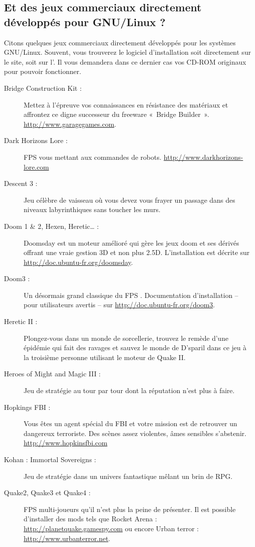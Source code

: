 \subsection{Et des jeux commerciaux directement développés pour GNU/Linux ?}
Citons quelques jeux commerciaux directement développés pour les systèmes GNU/Linux. Souvent, vous trouverez le logiciel d'installation soit directement sur le site, soit sur l'. Il vous demandera dans ce dernier cas vos CD-ROM originaux pour pouvoir fonctionner.\par
\begin{description}
\item[Bridge Construction Kit :] Mettez à l'épreuve vos connaissances en résistance des matériaux et affrontez ce digne successeur du freeware «~Bridge Builder~». \url{http://www.garagegames.com}.
\item[Dark Horizons Lore :] FPS vous mettant aux commandes de robots. \url{http://www.darkhorizons-lore.com}
\item[Descent 3 :] Jeu célèbre de vaisseau où vous devez vous frayer un passage dans des niveaux labyrinthiques sans toucher les murs.
\item[Doom 1 \& 2, Hexen, Heretic\ldots{} :] Doomsday est un moteur amélioré qui gère les jeux doom et ses dérivés offrant une vraie gestion 3D et non plus 2.5D. L'installation est décrite sur \url{http://doc.ubuntu-fr.org/doomsday}.
\item[Doom3 :] Un désormais grand classique du FPS . Documentation d'installation -- pour utilisateurs avertis -- sur \url{http://doc.ubuntu-fr.org/doom3}.
\item[Heretic II :] Plongez-vous dans un monde de sorcellerie, trouvez le remède d'une épidémie qui fait des ravages et sauvez le monde de D'sparil dans ce jeu à la troisième personne utilisant le moteur de Quake II.
\item[Heroes of Might and Magic III :] Jeu de stratégie au tour par tour dont la réputation n'est plus à faire.
\item[Hopkings FBI :] Vous êtes un agent spécial du FBI et votre mission est de retrouver un dangereux terroriste. Des scènes assez violentes, âmes sensibles s'abstenir. \url{http://www.hopkinsfbi.com}
\item[Kohan : Immortal Sovereigns :] Jeu de stratégie dans un univers fantastique mêlant un brin de RPG.
\item[Quake2, Quake3 et Quake4 :] FPS multi-joueurs qu'il n'est plus la peine de présenter. Il est possible d'installer des mods tels que Rocket Arena : \url{http://planetquake.gamespy.com} ou encore Urban terror : \url{http://www.urbanterror.net}.

\end{description}

